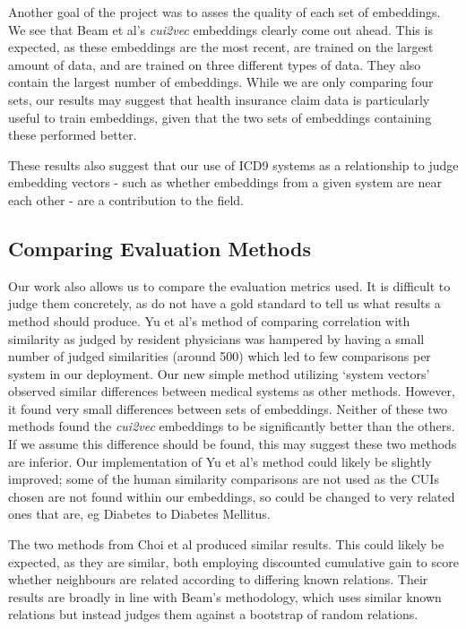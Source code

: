 \documentclass[10pt]{article}
\begin{document}
Another goal of the project was to asses the quality of each set of embeddings. We see that Beam et al's \emph{cui2vec} embeddings clearly come out ahead. This is expected, as these embeddings are the most recent, are trained on the largest amount of data, and are trained on three different types of data. They also contain the largest number of embeddings. While we are only comparing four sets, our results may suggest that health insurance claim data is particularly useful to train embeddings, given that the two sets of embeddings containing these performed better. 

These results also suggest that our use of ICD9 systems as a relationship to judge embedding vectors - such as whether embeddings from a given system are near each other - are a contribution to the field. 


\subsection{Comparing Evaluation Methods}
Our work also allows us to compare the evaluation metrics used. It is difficult to judge them concretely, as do not have a gold standard to tell us what results a method should produce. Yu et al's method of comparing correlation with similarity as judged by resident physicians was hampered by having a small number of judged similarities (around 500) which led to few comparisons per system in our deployment. Our new simple method utilizing `system vectors' observed similar differences between medical systems as other methods. However, it found very small differences between sets of embeddings. Neither of these two methods found the \emph{cui2vec} embeddings to be significantly better than the others. If we assume this difference should be found, this may suggest these two methods are inferior. Our implementation of Yu et al's method could likely be slightly improved; some of the human similarity comparisons are not used as the CUIs chosen are not found within our embeddings, so could be changed to very related ones that are, eg Diabetes to Diabetes Mellitus.  

The two methods from Choi et al produced similar results. This could likely be expected, as they are similar, both employing discounted cumulative gain to score whether neighbours are related according to differing known relations. Their results are broadly in line with Beam's methodology, which uses similar known relations but instead judges them against a bootstrap of random relations. 
\end{document}
